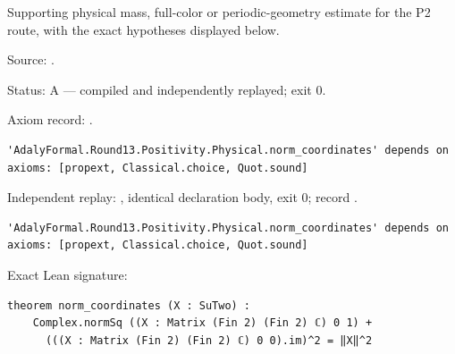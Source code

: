 \begin{theorem}[bp-481]
\label{bp-481}
\uses{}
\leanok
Supporting physical mass, full-color or periodic-geometry estimate for the P2 route, with the exact hypotheses displayed below.

\par Source: \texttt{}.
\par Status: A — compiled and independently replayed; exit 0.
\par Axiom record: \texttt{}.
\begin{verbatim}
'AdalyFormal.Round13.Positivity.Physical.norm_coordinates' depends on axioms: [propext, Classical.choice, Quot.sound]
\end{verbatim}
\par Independent replay: \texttt{}, identical declaration body, exit 0; record \texttt{}.
\begin{verbatim}
'AdalyFormal.Round13.Positivity.Physical.norm_coordinates' depends on axioms: [propext, Classical.choice, Quot.sound]
\end{verbatim}
\par Exact Lean signature:
\begin{verbatim}
theorem norm_coordinates (X : SuTwo) :
    Complex.normSq ((X : Matrix (Fin 2) (Fin 2) ℂ) 0 1) +
      (((X : Matrix (Fin 2) (Fin 2) ℂ) 0 0).im)^2 = ‖X‖^2
\end{verbatim}
\end{theorem}

